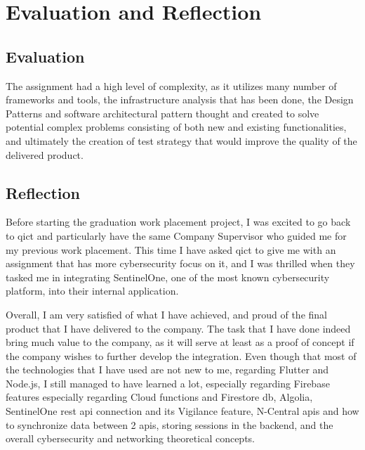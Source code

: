 \chapter{Evaluation and Reflection}
\section{Evaluation}

The assignment had a high level of complexity, as it utilizes many number of frameworks and tools, the infrastructure
analysis that has been done, the Design Patterns and software architectural pattern thought and created to solve
potential complex problems consisting of both new and existing functionalities, and ultimately the creation of test
strategy that would improve the quality of the delivered product.

\section{Reflection}
Before starting the graduation work placement project, I was excited to go back to \acrshort{qict} and particularly have the
same Company Supervisor who guided me for my previous work placement. This time I have asked \acrshort{qict} to give me with
an assignment that has more cybersecurity focus on it, and I was thrilled when they tasked me in integrating SentinelOne,
one of the most known cybersecurity platform, into their internal application.

Overall, I am very satisfied of what I have achieved, and proud of the final product that I have delivered to the company.
The task that I have done indeed bring much value to the company, as it will serve at least as a proof of concept if the company
wishes to further develop the integration. Even though that most of the technologies that I have used are not new to me, regarding
Flutter and Node.js, I still managed to have learned a lot, especially regarding Firebase features especially regarding Cloud functions
and Firestore \acrshort{db}, Algolia, SentinelOne \acrshort{rest} \acrshort{api} connection and its Vigilance feature, N-Central
\acrshort{api}s and how to synchronize data between 2 \acrshort{api}s, storing sessions in the backend, and the overall cybersecurity
and networking theoretical concepts.